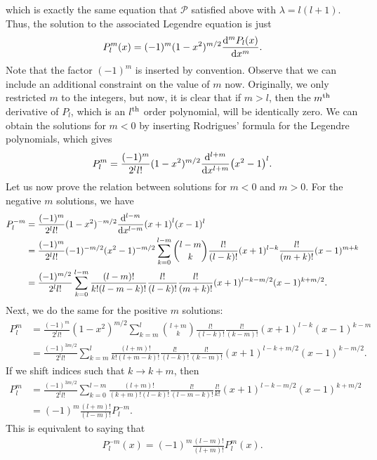 which is exactly the same equation that $\mathcal{P}$ satisfied above with $\lambda = l(l+1)$.
Thus, the solution to the associated Legendre equation is just
\begin{eqnarray}
    P_{l}^{m}(x) = (-1)^{m}(1-x^2)^{m/2} \dv[m]{P_{l}(x)}{x}
.\end{eqnarray}
Note that the factor $(-1)^{m}$ is inserted by convention.
Observe that we can include an additional constraint on the value of $m$ now.
Originally, we only restricted $m$ to the integers, but now, it is clear that if $m > l$, then the $m^{\rm th}$ derivative of $P_{l}$, which is an $l^{\rm th}$ order polynomial, will be identically zero.
We can obtain the solutions for $m < 0$ by inserting Rodrigues' formula for the Legendre polynomials, which gives
\begin{eqnarray}
    P_{l}^{m} = \frac{(-1)^{m}}{2^{l} l!} (1-x^2)^{m/2} \dv[l+m]{x} (x^2-1)^{l}
.\end{eqnarray}
Let us now prove the relation between solutions for $m < 0$ and $m > 0$.
For the negative $m$ solutions, we have
\begin{align}
    P_{l}^{-m} &= \frac{(-1)^{m}}{2^{l} l!} (1-x^2)^{-m/2} \dv[l-m]{x} (x+1)^{l}(x-1)^{l} \nonumber \\
    &= \frac{(-1)^{m}}{2^{l} l!} (-1)^{-m/2} (x^2 - 1)^{-m/2} \sum_{k=0}^{l-m} \binom{l-m}{k} \frac{l!}{(l-k)!} (x+1)^{l-k} \frac{l!}{(m+k)!} (x - 1)^{m+k} \nonumber \\
    &= \frac{(-1)^{m/2}}{2^{l} l!} \sum_{k=0}^{l-m} \frac{(l-m)!}{k!(l-m-k)!} \frac{l!}{(l-k)!} \frac{l!}{(m+k)!} (x+1)^{l-k-m/2}(x-1)^{k+m/2}
.\end{align}
Next, we do the same for the positive $m$ solutions:
\begin{align}
    P_{l}^{m} &= \frac{(-1)^{m}}{2^{l} l!} (1-x^2)^{m/2} \sum_{k=m}^{l} \binom{l+m}{k} \frac{l!}{(l-k)!} \frac{l!}{(k-m)!} (x+1)^{l-k} (x-1)^{k-m} \nonumber \\
    &= \frac{(-1)^{3m/2}}{2^{l} l!} \sum_{k=m}^{l} \frac{(l+m)!}{k!(l+m-k)!} \frac{l!}{(l-k)!} \frac{l!}{(k-m)!} (x+1)^{l-k+m/2} (x-1)^{k-m/2}
.\end{align}
If we shift indices such that $k \rightarrow k + m$, then
\begin{align}
    P_{l}^{m} &= \frac{(-1)^{3m/2}}{2^{l} l!} \sum_{k=0}^{l-m} \frac{(l+m)!}{(k+m)!(l-k)!} \frac{l!}{(l - m - k)!} \frac{l!}{k!} (x+1)^{l-k-m/2} (x-1)^{k+m/2} \nonumber \\
    &= (-1)^{m} \frac{(l+m)!}{(l-m)!} P_{l}^{-m}
.\end{align}
This is equivalent to saying that
\begin{eqnarray}
    P_{l}^{-m}(x) = (-1)^{m} \frac{(l-m)!}{(l+m)!} P_{l}^{m}(x)
.\end{eqnarray}




